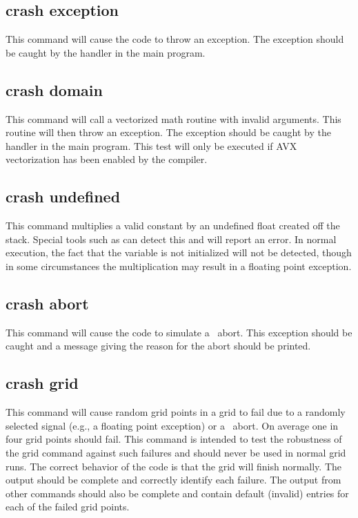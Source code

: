 \subsection{crash exception}

This command will cause
the code to throw an exception.
The exception should be caught by the handler in the
main program.

\subsection{crash domain}

This command will call a vectorized math routine with invalid arguments. This
routine will then throw an exception. The exception should be caught by the
handler in the main program. This test will only be executed if AVX
vectorization has been enabled by the compiler.

\subsection{crash undefined}

This command multiplies a valid constant
by an undefined float created off the stack.
Special tools such as  can detect this and will report an error.
In normal execution, the fact that the variable is not initialized will not be
detected, though in some circumstances the multiplication may result in a floating
point exception.

\subsection{crash abort}

This command will cause the code to simulate a \Cloudy\ abort. This exception
should be caught and a message giving the reason for the abort should be
printed.

\subsection{crash grid}

This command will cause random grid points in a grid to fail due to a randomly
selected signal (e.g., a floating point exception) or a \Cloudy\ abort. On
average one in four grid points should fail. This command is intended to test
the robustness of the grid command against such failures and should never be
used in normal grid runs. The correct behavior of the code is that the grid
will finish normally. The  output should be complete and
correctly identify each failure. The output from other 
commands should also be complete and contain default (invalid) entries for
each of the failed grid points.

